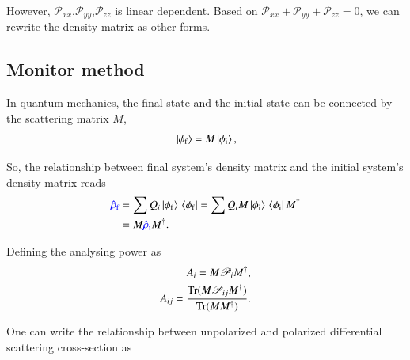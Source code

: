 \documentclass[twocolumn,twoside,showpacs,showkeys,preprintnumbers,superscriptaddress,amsmath,amssymb,prc,nofootinbib,a4paper]{revtex4}
\begin{document}
However, $\mathscr{P}_{x x}$,$\mathscr{P}_{y y}$,$\mathscr{P}_{z z}$ is linear dependent. Based on $\mathscr{P}_{x x} + \mathscr{P}_{y y} + \mathscr{P}_{z z} = 0$, we can rewrite the density matrix as other forms.




\subsection{Monitor method}


In quantum mechanics, the final state and the initial state can be connected by the scattering matrix $M$,
    \begin{align}
        \ket*{\phi_{\mathrm{f}}}  = M \ket*{\phi_{\mathrm{i}}},
    \end{align}

So, the relationship between final system's density matrix and the initial system's density matrix reads
    \begin{align}
        	\textcolor{blue}{\hat{\rho}_{\mathrm{f}}} &= \sum {Q}_i \ket*{\phi_{\mathrm{f}}} \bra*{\phi_{\mathrm{f}}} = \sum {Q}_i M \ket*{\phi_{\mathrm{i}}} \bra*{\phi_{\mathrm{i}}} M^\dagger  \nonumber \\
        &=M\textcolor{blue}{\hat{\rho}_{\mathrm{i}}} M^\dagger.
    \end{align}

    Defining the analysing power as 
\begin{align}
    A_i = M \mathscr{P}_i M^\dagger ,\\
    A_{ij} = \frac{{\rm Tr} (M \mathscr{P}_{ij} M^\dagger)}{{\rm Tr}(MM^\dagger)}.
\end{align}

One can write the relationship between unpolarized and polarized differential scattering cross-section as
\end{document}
